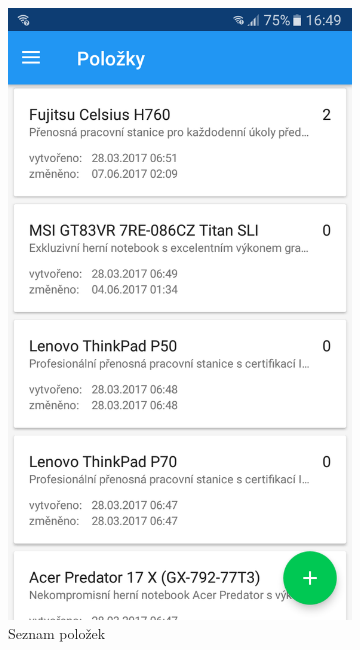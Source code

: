 \documentclass[czech,BP]{thesiskiv}
\begin{document}
\begin{figure}[H]
	\centering
  \begin{subfigure}[b]{0.3\textwidth}
    \centering
	\includegraphics[width=\textwidth]{../images/client_android/Screenshot_20170607-164919.png}	
	\caption{Seznam položek}
	\label{fig:Screenshot_20170607-164919}
  \end{subfigure}
  \begin{subfigure}[b]{0.3\textwidth}
    \centering

\end{subfigure}
\end{figure}
\end{document}
